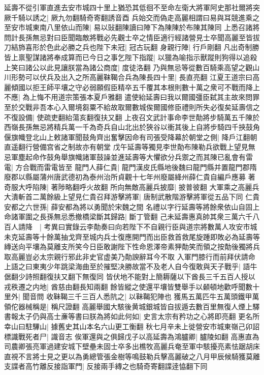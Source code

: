 延壽不從引軍直進去安市城四十里上猶恐其低徊不至命左衛大將軍阿史那社爾將突厥千騎以誘之|{
	厥九勿翻騎奇寄翻誘音酉}
兵始交而偽走高麗相謂曰易與耳競進乘之至安市城東南八里依山而陳|{
	易以䜴翻陳讀曰陣下為陳陳於布陳其陳同}
上悉召諸將問計長孫無忌對曰臣聞臨敵將戰必先觀士卒之情臣適行經諸營見士卒聞高麗至皆拔刀結斾喜形於色此必勝之兵也陛下未冠|{
	冠古玩翻}
身親行陣|{
	行戶剛翻}
凡出奇制勝皆上禀聖謀諸將奉成算而已今日之事乞陛下指蹤|{
	以獵為喻指示獸蹤則狗得以追殺}
上笑曰諸公以此見讓朕當為諸公商度|{
	度徒洛翻}
乃與無忌等從數百騎乘高望之觀山川形勢可以伏兵及出入之所高麗靺鞨合兵為陳長四十里|{
	長直亮翻}
江夏王道宗曰高麗傾國以拒王師平壤之守必弱願假臣精卒五千覆其本根則數十萬之衆可不戰而降上不應|{
	為上悔不用道宗策張本夏戶雅翻}
遣使紿延壽曰我以爾國彊臣弑其主故來問罪至於交戰非吾本心入爾境芻粟不給故取爾數城俟爾國修臣禮則所失必復矣延壽信之不復設備|{
	使疏吏翻紿蕩亥翻復扶又翻}
上夜召文武計事命李世勣將步騎萬五千陳於西嶺長孫無忌將精兵萬一千為奇兵自山北出於狹谷以衝其後上自將步騎四千挾鼓角偃旗幟登北山上敕諸軍聞鼓角齊出奮擊因命有司張受降幕於朝堂之側|{
	降戶江翻朝直遥翻行營備宫省之制故亦有朝堂}
戊午延壽等獨見李世勣布陳勒兵欲戰上望見無忌軍塵起命作鼓角舉旗幟諸軍鼓譟並進延壽等大懼欲分兵禦之而其陳已亂會有雷電|{
	方合戰而雷電皆至}
龍門人薛仁貴|{
	龍門漢皮氏縣地後魏曰龍門縣并置龍門郡隋廢郡以縣屬蒲州唐武德初為泰州治所貞觀十七年州廢屬絳州薛仁貴自編戶應募}
著奇服大呼陷陳|{
	著陟略翻呼火故翻}
所向無敵高麗兵披靡|{
	披普彼翻}
大軍乘之高麗兵大潰斬首二萬餘級上望見仁貴召拜游擊將軍|{
	唐制武散階游擊將軍從五品下同}
仁貴安都之六世孫|{
	薛安都為將以勇聞於宋魏之間}
名禮以字行延壽等將餘衆依山自固上命諸軍圍之長孫無忌悉撤橋梁斷其歸路|{
	斷丁管翻}
己未延壽惠真帥其衆三萬六千八百人請降　|{
	考異曰實錄云李勣奏曰向若陛下不自親行臣與道宗將數萬人攻安市城未克延壽等十餘萬抽戈齊至城内兵士復應開門而出臣救首救尾旋踵即敗必為延壽等縳送向平壤為莫離支所笑今日臣敢謝陛下性命恩澤帝素狎勣笑而領之按勣後獨將兵取高麗豈必太宗親行邪此非史官虚美乃勣諛辭耳今不取}
入軍門膝行而前拜伏請命上語之曰東夷少年跳梁海曲至於摧堅决勝故當不及老人自今復敢與天子戰乎|{
	語牛倨翻少詩照翻復扶又翻下無復同}
皆伏地不能對上簡耨薩以下酋長三千五百人授以戎秩遷之内地|{
	酋慈由翻長知兩翻}
餘皆縱之使還平壤皆雙舉手以顙頓地歡呼聞數十里外|{
	聞音問}
收靺鞨三千三百人悉阬之|{
	以靺鞨犯陣也}
獲馬五萬匹牛五萬頭鐵甲萬領佗器械稱是|{
	稱尺證翻}
高麗舉國大駭後黄城銀城皆自拔遁去數百里無復人煙上驛書報太子仍與高士亷等書曰朕為將如此何如|{
	史言太宗有矜功之心將即亮翻}
更名所幸山曰駐驆山|{
	據舊史其山本名六山更工衡翻}
秋七月辛未上徙營安市城東嶺己卯詔標識戰死者尸|{
	識音志}
俟軍還與之俱歸戊子以高延壽為鴻臚卿|{
	臚陵如翻}
高惠直為司農卿張亮軍過建安城下壁壘未固士卒多出樵牧高麗兵奄至軍中駭擾亮素怯踞胡床直視不言將士見之更以為勇總管張金樹等鳴鼓勒兵擊高麗破之八月甲辰候騎獲莫離支諜者高竹離反接詣軍門|{
	反接兩手縳之也騎奇寄翻諜逹恊翻下同}
